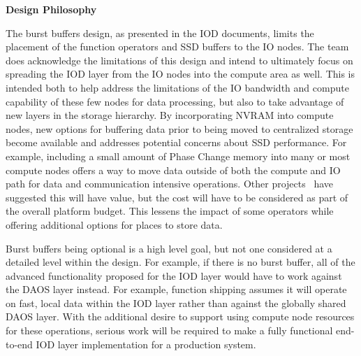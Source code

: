 \documentclass[conference]{IEEEtran}
\begin{document}
\noindent\textbf{Design Philosophy}

The burst buffers design, as presented in the IOD documents, limits the
placement of the function operators and SSD buffers to the IO nodes. The team
does acknowledge the limitations of this design and intend to ultimately focus
on spreading the IOD layer from the IO nodes into the compute area as well.
This is intended both to help address the limitations of the IO bandwidth and
compute capability of these few nodes for data processing, but also to take
advantage of new layers in the storage hierarchy. By incorporating NVRAM into
compute nodes, new options for buffering data prior to being moved to
centralized storage become available and addresses potential concerns about
SSD performance. For example, including a small amount of Phase Change memory
into many or most compute nodes offers a way to move data outside of both the
compute and IO path for data and communication intensive operations. Other 
projects~\cite{zheng:2010:predata} have suggested this will have value, but the
cost will have to be considered as part of the overall platform budget. This
lessens the impact of some operators while offering additional options for
places to store data.

Burst buffers being optional is a high level goal, but not one considered at a
detailed level within the design. For example, if there is no burst buffer, all
of the advanced functionality proposed for the IOD layer would have to work
against the DAOS layer instead. For example, function shipping assumes it will
operate on fast, local data within the IOD layer rather than against the
globally shared DAOS layer. With the additional desire to support using compute
node resources for these operations, serious work will be required to make a
fully functional end-to-end IOD layer implementation for a production system.

\end{document}
